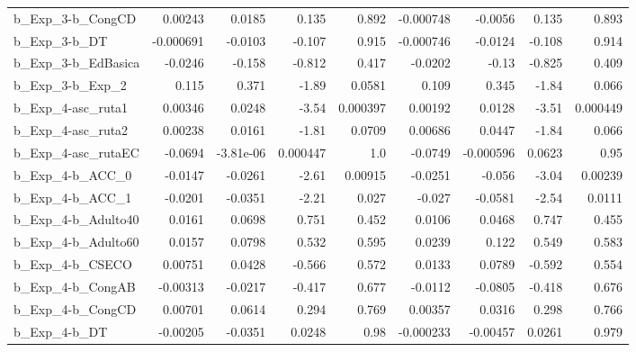 \begin{tabular}{lrrrrrrrr}
b\_Exp\_3-b\_CongCD           &     0.00243 &       0.0185 &     0.135 &    0.892 &  -0.000748 &     -0.0056 &        0.135 &         0.893 \\
b\_Exp\_3-b\_DT               &   -0.000691 &      -0.0103 &    -0.107 &    0.915 &  -0.000746 &     -0.0124 &       -0.108 &         0.914 \\
b\_Exp\_3-b\_EdBasica         &     -0.0246 &       -0.158 &    -0.812 &    0.417 &    -0.0202 &       -0.13 &       -0.825 &         0.409 \\
b\_Exp\_3-b\_Exp\_2            &       0.115 &        0.371 &     -1.89 &   0.0581 &      0.109 &       0.345 &        -1.84 &         0.066 \\
b\_Exp\_4-asc\_ruta1          &     0.00346 &       0.0248 &     -3.54 & 0.000397 &    0.00192 &      0.0128 &        -3.51 &      0.000449 \\
b\_Exp\_4-asc\_ruta2          &     0.00238 &       0.0161 &     -1.81 &   0.0709 &    0.00686 &      0.0447 &        -1.84 &         0.066 \\
b\_Exp\_4-asc\_rutaEC         &     -0.0694 &    -3.81e-06 &  0.000447 &      1.0 &    -0.0749 &   -0.000596 &       0.0623 &          0.95 \\
b\_Exp\_4-b\_ACC\_0            &     -0.0147 &      -0.0261 &     -2.61 &  0.00915 &    -0.0251 &      -0.056 &        -3.04 &       0.00239 \\
b\_Exp\_4-b\_ACC\_1            &     -0.0201 &      -0.0351 &     -2.21 &    0.027 &     -0.027 &     -0.0581 &        -2.54 &        0.0111 \\
b\_Exp\_4-b\_Adulto40         &      0.0161 &       0.0698 &     0.751 &    0.452 &     0.0106 &      0.0468 &        0.747 &         0.455 \\
b\_Exp\_4-b\_Adulto60         &      0.0157 &       0.0798 &     0.532 &    0.595 &     0.0239 &       0.122 &        0.549 &         0.583 \\
b\_Exp\_4-b\_CSECO            &     0.00751 &       0.0428 &    -0.566 &    0.572 &     0.0133 &      0.0789 &       -0.592 &         0.554 \\
b\_Exp\_4-b\_CongAB           &    -0.00313 &      -0.0217 &    -0.417 &    0.677 &    -0.0112 &     -0.0805 &       -0.418 &         0.676 \\
b\_Exp\_4-b\_CongCD           &     0.00701 &       0.0614 &     0.294 &    0.769 &    0.00357 &      0.0316 &        0.298 &         0.766 \\
b\_Exp\_4-b\_DT               &    -0.00205 &      -0.0351 &    0.0248 &     0.98 &  -0.000233 &    -0.00457 &       0.0261 &         0.979 \\

\end{tabular}

